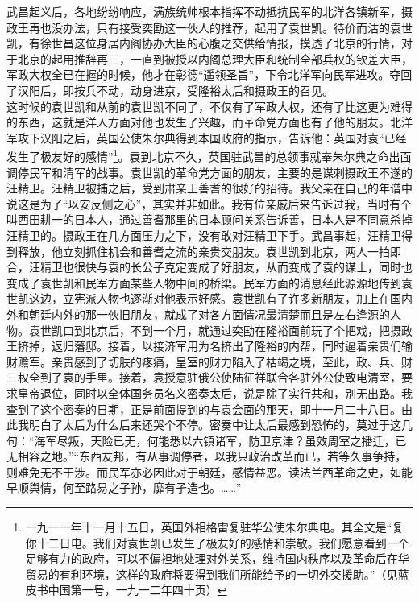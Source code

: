 武昌起义后，各地纷纷响应，满族统帅根本指挥不动抵抗民军的北洋各镇新军，摄政王再也没办法，只有接受奕劻这一伙人的推荐，起用了袁世凯。待价而沽的袁世凯，有徐世昌这位身居内阁协办大臣的心腹之交供给情报，摸透了北京的行情，对于北京的起用推辞再三，一直到被授以内阁总理大臣和统制全部兵权的钦差大臣，军政大权全已在握的时候，他才在彰德“遥领圣旨”，下令北洋军向民军进攻。夺回了汉阳后，即按兵不动，动身进京，受隆裕太后和摄政王的召见。\\

这时候的袁世凯和从前的袁世凯不同了，不仅有了军政大权，还有了比这更为难得的东西，这就是洋人方面对他也发生了兴趣，而革命党方面也有了他的朋友。北洋军攻下汉阳之后，英国公使朱尔典得到本国政府的指示，告诉他：英国对袁“已经发生了极友好的感情”\footnote{一九一一年十一月十五日，英国外相格雷复驻华公使朱尔典电。其全文是“复你十二日电。我们对袁世凯已发生了极友好的感情和崇敬。我们愿意看到一个足够有力的政府，可以不偏袒地处理对外关系，维持国内秩序以及革命后在华贸易的有利环境，这样的政府将要得到我们所能给予的一切外交援助。”（见蓝皮书中国第一号，一九一二年四十页）}。袁到北京不久，英国驻武昌的总领事就奉朱尔典之命出面调停民军和清军的战事。袁世凯的革命党方面的朋友，主要的是谋刺摄政王不遂的汪精卫。汪精卫被捕之后，受到肃亲王善耆的很好的招待。我父亲在自己的年谱中说这是为了“以安反侧之心”，其实并非如此。我有位亲戚后来告诉过我，当时有个叫西田耕一的日本人，通过善耆那里的日本顾问关系告诉善，日本人是不同意杀掉汪精卫的。摄政王在几方面压力之下，没有敢对汪精卫下手。武昌事起，汪精卫得到释放，他立刻抓住机会和善耆之流的亲贵交朋友。袁世凯到北京，两人一拍即合，汪精卫也很快与袁的长公子克定变成了好朋友，从而变成了袁的谋士，同时也变成了袁世凯和民军方面某些人物中间的桥梁。民军方面的消息经此源源地传到袁世凯这边，立宪派人物也逐渐对他表示好感。袁世凯有了许多新朋友，加上在国内外和朝廷内外的那一伙旧朋友，就成了对各方面情况最清楚而且是左右逢源的人物。袁世凯口到北京后，不到一个月，就通过奕劻在隆裕面前玩了个把戏，把摄政王挤掉，返归藩邸。接着，以接济军用为名挤出了隆裕的内帮，同时逼着亲贵们输财赡军。亲贵感到了切肤的疼痛，皇室的财力陷入了枯竭之境，至此，政、兵、财三权全到了袁的手里。接着，袁授意驻俄公使陆征祥联合各驻外公使致电清室，要求皇帝退位，同时以全体国务员名义密奏太后，说是除了实行共和，别无出路。我查到了这个密奏的日期，正是前面提到的与袁会面的那天，即十一月二十八日。由此我明白了太后为什么后来还哭个不停。密奏中让太后最感到恐怖的，莫过于这几句：“海军尽叛，天险已无，何能悉以六镇诸军，防卫京津？虽效周室之播迁，已无相容之地。”“东西友邦，有从事调停者，以我只政治改革而已，若等久事争持，则难免无不干涉。而民军亦必因此对于朝廷，感情益恶。读法兰西革命之史，如能早顺舆情，何至路易之子孙，靡有孑造也。……”\\

